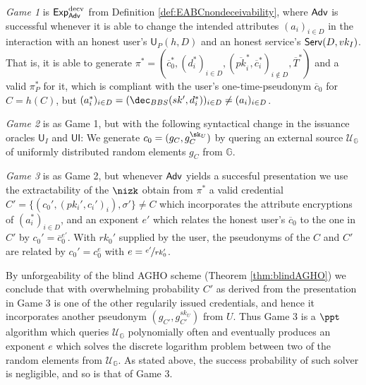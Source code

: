\begin{description}
\item
\emph{Game 1} is $\operatorname{\mathsf{Exp}_{\mathsf{Adv}}^{decv}}$ from Definition \ref{def:EABCnondeceivability}, where $\mathsf{Adv}$ is successful whenever it is able to  change the intended attributes $(a_i)_{i\in D}$ in the interaction with an honest user's $\mathsf{U}_P(h, D)$ and an honest service's $\operatorname{\mathsf{Serv}}(D,vk_I)$.
That is, it is able to generate $\pi^*=(\overline c_0^*, (d_i^*)_{i\in D}, (\overline{pk}_i^*, \overline c_i^*)_{i\notin D}, \overline T^*)$ and a valid $\pi_P^*$ for it, which is compliant with the user's one-time-pseudonym $\overline c_0$ for $C=h(C)$,  but $(a_i^*)_{i\in D} = (\dec_{BBS}(sk', d_i^*))_{i\in D}\neq (a_i)_{i\in D}$.

\item
\emph{Game 2} is as Game 1, but with the following syntactical change in the issuance oracles $\mathsf{U}_I$ and $\mathsf{UI}$: 
We generate $c_0=(g_C,g_C^{\sk_U})$  by quering an external source $\mathcal U_{\mathbb G}$ of uniformly distributed random elements $g_C$ from $\mathbb G$. 
 
\item
\emph{Game 3} is as Game 2, but whenever $\mathsf{Adv}$ yields a succesful presentation we use the extractability of the $\nizk$ obtain from $\pi^*$ a valid credential $C'=\{(c_0', (pk_i',c_i')_{i}),\sigma'\} \neq C$ 
which incorporates the attribute encryptions of $(a_i^*)_{i\in D}$, and an exponent $e'$ which relates the honest user's $\overline c_0$ to the one in $C'$ by $c_0' = \overline c_0^{e'}$.
With  $rk_0'$ supplied by the user, the pseudonyms of the $C$ and $C'$ are related by
$c_0' = c_0^{e}$ with $e= \nicefrac{e'}{rk_0'}$.
\end{description}

By unforgeability of the blind AGHO scheme (Theorem \ref{thm:blindAGHO}) we conclude that with overwhelming probability $C'$ as derived from the presentation in Game 3 is one of the other regularily issued credentials, and hence it incorporates another pseudonym $(g_{C'}, g_{C'}^{sk_U})$ from $U$.
Thus Game 3 is a $\ppt$ algorithm which queries $\mathcal U_{\mathbb G}$ polynomially often and eventually produces an exponent $e$ which solves the discrete logarithm problem between two of the random elements from $\mathcal U_{\mathbb G}$.
As stated above, the success probability of such solver is negligible, and so is that of Game 3.

